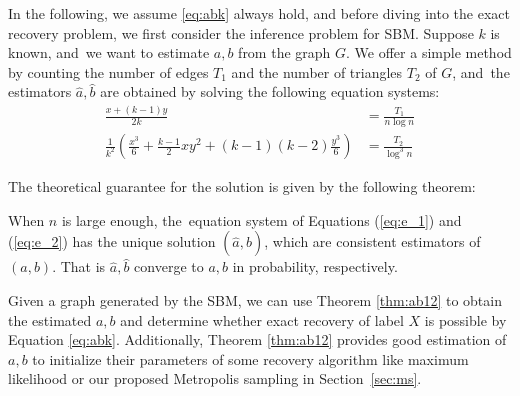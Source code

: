 \documentclass[entropy,article,accept,moreauthors,pdftex]{Definitions/mdpi}
\newcommand{\1}{\mathbbm{1}}
\begin{document}
In the following, we assume \eqref{eq:abk} always hold,
and before diving into the exact recovery problem, we first consider the inference problem for SBM.
Suppose $k$ is known, and~we want to estimate $a,b$ from the graph $G$.
We offer a simple method
by counting the number of edges $T_1$ and the number of triangles $T_2$ of $G$, and~the estimators $\hat{a}, \hat{b}$ are
obtained by solving the following equation systems:
\begin{align}
\frac{x+(k-1)y}{2k} & = \frac{T_1}{n\log n} \label{eq:e_1}\\
\frac{1}{k^2}
\left(\frac{x^3}{6} + \frac{k-1}{2}xy^2 + (k-1)(k-2)\frac{y^3}{6}\right) & = \frac{T_2}{\log^3 n} \label{eq:e_2}
\end{align}

The theoretical guarantee for the solution is given by the following theorem:
\begin{Theorem}\label{thm:ab12}
When $n$ is large enough, the~equation system of Equations (\ref{eq:e_1}) and (\ref{eq:e_2}) has the  unique solution $(\hat{a}, \hat{b})$,
which are consistent estimators
of $(a,b)$. That is $\hat{a}, \hat{b}$ converge to $a,b$ in probability, respectively.
\end{Theorem}
Given a graph generated by the SBM, we can use Theorem \ref{thm:ab12} to obtain the estimated $a,b$ and determine whether
exact recovery of label $X$ is possible by Equation \eqref{eq:abk}. Additionally,  Theorem \ref{thm:ab12} provides good estimation of $a,b$ to initialize their parameters of
some recovery algorithm like maximum likelihood or our proposed Metropolis sampling in Section~\ref{sec:ms}.
\end{document}
